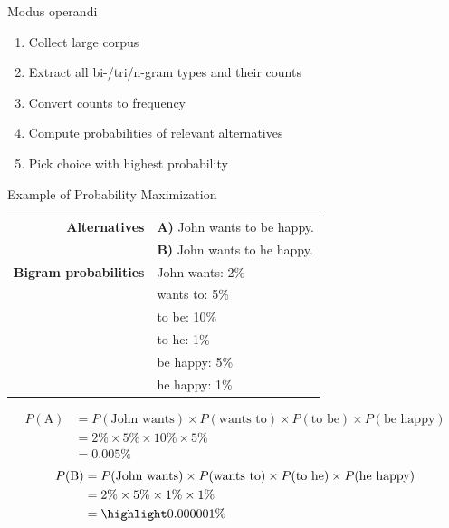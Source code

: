 \documentclass[xcolor={usenames,svgnames,x11names,dvipsnames,table}]{beamer}
\begin{document}
\begin{frame}{Modus operandi}
    \begin{enumerate}
        \item Collect large corpus
        \item Extract all bi-\slash tri\slash n-gram types and their counts
        \item Convert counts to frequency
        \item Compute probabilities of relevant alternatives\\
        \item Pick choice with highest probability
    \end{enumerate}
\end{frame}

\begin{frame}{Example of Probability Maximization}
    \begin{tabular}{rl}
        \textbf{Alternatives} & \textbf{A)} John wants to be happy.\\
                              & \textbf{B)} John wants to he happy.\\[12pt]

        \textbf{Bigram probabilities} & John wants: 2\%\\
                                      & wants to: 5\%\\
                                      & to be: 10\%\\
                                      & to he: 1\%\\
                                      & be happy: 5\%\\
                                      & he happy: 1\%\\
    \end{tabular}

    \pause
    \begin{align*}
        P(\text{A}) &= P(\text{John wants}) \times
                       P(\text{wants to}) \times
                       P(\text{to be}) \times
                       P(\text{be happy})\\ 
                    &= 2\% \times 5\% \times 10\% \times 5\%\\
                    &= 0.005\%
    \end{align*}
    \begin{align*}
        P(\text{B}) &= P(\text{John wants}) \times
                       P(\text{wants to}) \times
                       P(\text{to he}) \times
                       P(\text{he happy})\\ 
                    &= 2\% \times 5\% \times 1\% \times 1\%\\
                    &= \highlight{0.000001\%}
    \end{align*}
\end{frame}
\end{document}
